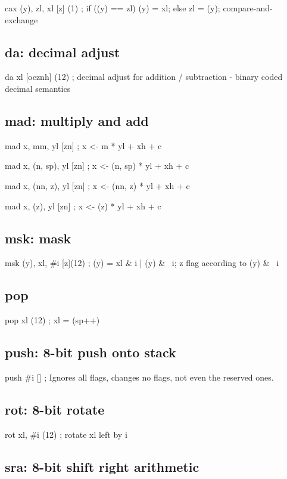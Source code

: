 \documentclass{book}
\begin{document}
cax (y), zl, xl [z] (1)   ; if ((y) == zl) (y) = xl; else zl = (y); compare-and-exchange


\subsection{da: decimal adjust}

da xl [ocznh] (12)        ; decimal adjust for addition / subtraction - binary coded decimal semantics


\subsection{mad: multiply and add}

mad x, mm, yl [zn]        ; x <- m * yl + xh + c

mad x, (n, sp), yl [zn]   ; x <- (n, sp) * yl + xh + c

mad x, (nn, z), yl [zn]   ; x <- (nn, z) * yl + xh + c

mad x, (z), yl [zn]       ; x <- (z) * yl + xh + c


\subsection{msk: mask}

msk (y), xl, \#i [z](12)   ; (y) = xl \& i | (y) \& ~i; z flag according to (y) \& ~i


\subsection{pop}

pop xl (12)               ; xl = (sp++)


\subsection{push: 8-bit push onto stack}

push \#i []                ; Ignores all flags, changes no flags, not even the reserved ones.


\subsection{rot: 8-bit rotate}

rot xl, \#i (12)           ; rotate xl left by i


\subsection{sra: 8-bit shift right arithmetic}
\end{document}
